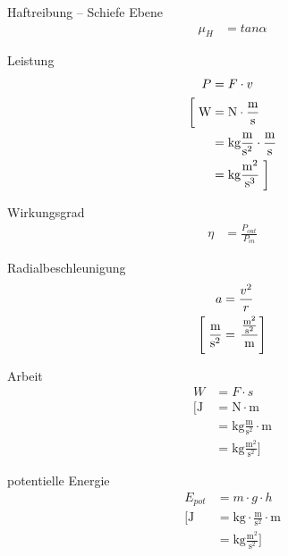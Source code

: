 \documentclass[a8paper,9pt,grid=front]{kartei}
\begin{document}
\begin{karte}{Haftreibung -- Schiefe Ebene}
    \begin{align*}
        \mu_H &= tan \alpha
    \end{align*}
\end{karte}

\begin{karte}{Leistung}
    \begin{align*}
        P &= F \cdot v \\
        \left[ \vphantom{\frac{m^2}{s^3}} \right.
            \text{W} &= 
            \text{N} \cdot \frac{\text{m}}{\text{s}} \\
            &= \text{kg} \frac{\text{m}}{\text{s}^2} \cdot \frac{\text{m}}{\text{s}} \\
            &= \text{kg} \frac{\text{m}^2}{\text{s}^3} 
            \left. \vphantom{\frac{m^2}{s^3}} \right]
    \end{align*}
\end{karte}

\begin{karte}{Wirkungsgrad}
    \begin{align*}
        \eta &= \frac{P_{out}}{P_{in}}
    \end{align*}
\end{karte}

\begin{karte}{Radialbeschleunigung}
    \begin{align*}
        a &= \frac{v^2}{r} \\
        \left[ \vphantom{\frac{\frac{\text{m}^2}{\text{s}^2}}{\text{m}}} \right.
            \frac{\text{m}}{\text{s}^2} &= \left.  \frac{\frac{\text{m}^2}{\text{s}^2}}{\text{m}} 
             \right]
    \end{align*}
\end{karte}

\begin{karte}{Arbeit}
    \begin{align*}
        W &= F \cdot s \\
        \bigg[
            \text{J} &= \text{N} \cdot \text{m} \\
            &= \text{kg}\frac{\text{m}}{\text{s}^2} \cdot \text{m}\\
            &= \text{kg}\frac{\text{m}^2}{\text{s}^2}  
            \bigg]
    \end{align*}
\end{karte}

\begin{karte}{potentielle Energie}
    \begin{align*}
        E_{pot} &= m \cdot g \cdot h \\
        \bigg[
            \text{J} &= \text{kg} \cdot \frac{\text{m}}{\text{s}^2} \cdot \text{m} \\
            &= \text{kg}\frac{\text{m}^2}{\text{s}^2} 
            \bigg]
    \end{align*}
\end{karte}
\end{document}
